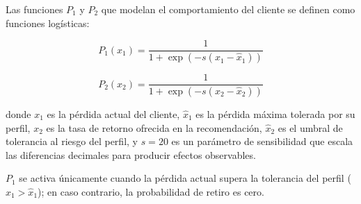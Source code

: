 Las funciones $P_1$ y $P_2$ que modelan el comportamiento del cliente se definen como funciones log\'isticas:
 
\begin{equation}
P_1(x_1) = \frac{1}{1 + \exp\left(-s(x_1 - \hat{x}_1)\right)}
\end{equation}
 
\begin{equation}
P_2(x_2) = \frac{1}{1 + \exp\left(-s(x_2 - \hat{x}_2)\right)}
\end{equation}
 
donde $x_1$ es la p\'erdida actual del cliente, $\hat{x}_1$ es la p\'erdida m\'axima tolerada por su perfil, $x_2$ es la tasa de retorno ofrecida en la recomendaci\'on, $\hat{x}_2$ es el umbral de tolerancia al riesgo del perfil, y $s = 20$ es un par\'ametro de sensibilidad que escala las diferencias decimales para producir efectos observables.
 
$P_1$ se activa \'unicamente cuando la p\'erdida actual supera la tolerancia del perfil ($x_1 > \hat{x}_1$); en caso contrario, la probabilidad de retiro es cero.
